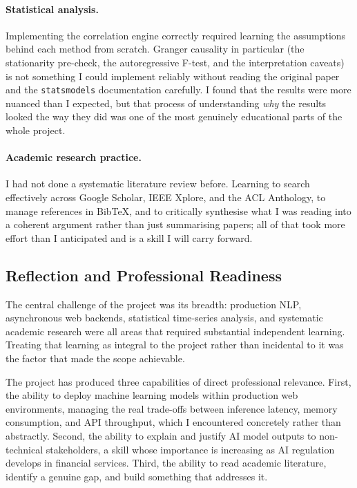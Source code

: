 \paragraph{Statistical analysis.}
Implementing the correlation engine correctly required learning the assumptions behind each method from scratch. Granger causality in particular (the stationarity pre-check, the autoregressive F-test, and the interpretation caveats) is not something I could implement reliably without reading the original paper \citep{granger1969} and the \texttt{statsmodels} documentation carefully. I found that the results were more nuanced than I expected, but that process of understanding \textit{why} the results looked the way they did was one of the most genuinely educational parts of the whole project.

\paragraph{Academic research practice.}
I had not done a systematic literature review before. Learning to search effectively across Google Scholar, IEEE Xplore, and the ACL Anthology, to manage references in BibTeX, and to critically synthesise what I was reading into a coherent argument rather than just summarising papers; all of that took more effort than I anticipated and is a skill I will carry forward.

\subsection{Reflection and Professional Readiness}

The central challenge of the project was its breadth: production NLP, asynchronous web backends, statistical time-series analysis, and systematic academic research were all areas that required substantial independent learning. Treating that learning as integral to the project rather than incidental to it was the factor that made the scope achievable.

The project has produced three capabilities of direct professional relevance. First, the ability to deploy machine learning models within production web environments, managing the real trade-offs between inference latency, memory consumption, and API throughput, which I encountered concretely rather than abstractly. Second, the ability to explain and justify AI model outputs to non-technical stakeholders, a skill whose importance is increasing as AI regulation develops in financial services. Third, the ability to read academic literature, identify a genuine gap, and build something that addresses it.

